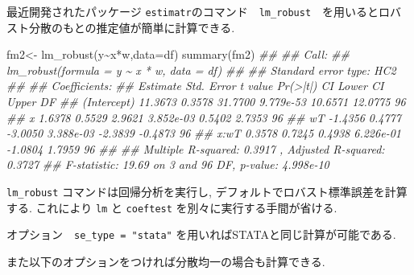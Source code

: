 \documentclass[
  letterpaper,
  xelatex,
  ja=standard, xelatex]{bxjsbook}
\newenvironment{Shaded}{\begin{snugshade}}{\end{snugshade}}
\newcommand{\AttributeTok}[1]{\textcolor[rgb]{0.40,0.45,0.13}{#1}}
\newcommand{\DocumentationTok}[1]{\textcolor[rgb]{0.37,0.37,0.37}{\textit{#1}}}
\newcommand{\FunctionTok}[1]{\textcolor[rgb]{0.28,0.35,0.67}{#1}}
\newcommand{\NormalTok}[1]{\textcolor[rgb]{0.00,0.23,0.31}{#1}}
\newcommand{\OtherTok}[1]{\textcolor[rgb]{0.00,0.23,0.31}{#1}}
\newcommand{\SpecialCharTok}[1]{\textcolor[rgb]{0.37,0.37,0.37}{#1}}
\begin{document}
最近開発されたパッケージ
\texttt{estimatr}のコマンド　\texttt{lm\_robust}　を用いるとロバスト分散のもとの推定値が簡単に計算できる.

\begin{Shaded}
\begin{Highlighting}[]
\NormalTok{fm2}\OtherTok{\textless{}{-}} \FunctionTok{lm\_robust}\NormalTok{(y}\SpecialCharTok{\textasciitilde{}}\NormalTok{x}\SpecialCharTok{*}\NormalTok{w,}\AttributeTok{data=}\NormalTok{df)}
\FunctionTok{summary}\NormalTok{(fm2)}
\DocumentationTok{\#\# }
\DocumentationTok{\#\# Call:}
\DocumentationTok{\#\# lm\_robust(formula = y \textasciitilde{} x * w, data = df)}
\DocumentationTok{\#\# }
\DocumentationTok{\#\# Standard error type:  HC2 }
\DocumentationTok{\#\# }
\DocumentationTok{\#\# Coefficients:}
\DocumentationTok{\#\#             Estimate Std. Error t value  Pr(\textgreater{}|t|) CI Lower CI Upper DF}
\DocumentationTok{\#\# (Intercept)  11.3673     0.3578 31.7700 9.779e{-}53  10.6571  12.0775 96}
\DocumentationTok{\#\# x             1.6378     0.5529  2.9621 3.852e{-}03   0.5402   2.7353 96}
\DocumentationTok{\#\# wT           {-}1.4356     0.4777 {-}3.0050 3.388e{-}03  {-}2.3839  {-}0.4873 96}
\DocumentationTok{\#\# x:wT          0.3578     0.7245  0.4938 6.226e{-}01  {-}1.0804   1.7959 96}
\DocumentationTok{\#\# }
\DocumentationTok{\#\# Multiple R{-}squared:  0.3917 ,    Adjusted R{-}squared:  0.3727 }
\DocumentationTok{\#\# F{-}statistic: 19.69 on 3 and 96 DF,  p{-}value: 4.998e{-}10}
\end{Highlighting}
\end{Shaded}

\texttt{lm\_robust} コマンドは回帰分析を実行し,
デフォルトでロバスト標準誤差を計算する. これにより \texttt{lm} と
\texttt{coeftest} を別々に実行する手間が省ける.

オプション　\texttt{se\_type\ =\ "stata"}
を用いればSTATAと同じ計算が可能である.

また以下のオプションをつければ分散均一の場合も計算できる.
\end{document}
